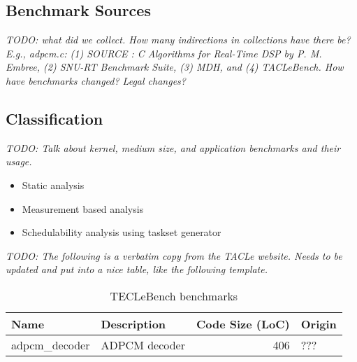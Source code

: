 \documentclass[a4paper,UKenglish]{oasics}
\newcommand{\todo}[1]{{\emph{TODO: #1}}}
\begin{document}
\subsection{Benchmark Sources}

\todo{what did we collect. How many indirections in collections have there be?
E.g., adpcm.c: (1) SOURCE : C Algorithms for Real-Time DSP by P. M. Embree,
(2) SNU-RT Benchmark Suite, (3) MDH, and (4) TACLeBench. How have
benchmarks  changed? Legal changes?}

\subsection{Classification}

\todo{Talk about kernel, medium size, and application benchmarks and their usage.}
\begin{itemize}
\item Static analysis
\item Measurement based analysis
\item Schedulability analysis using taskset generator
\end{itemize}

\todo{The following is a verbatim copy from the TACLe website.
Needs to be updated and put into a nice table, like the following template.}

\begin{table}
  \centering
  \caption{TECLeBench benchmarks}
  \label{tab:bench}
  \begin{tabular}{llrl}
    \toprule
    Name & Description & Code Size (LoC) & Origin \\
    \midrule
    adpcm\_decoder & ADPCM decoder & 406 & ??? \\
    \bottomrule
  \end{tabular}
\end{table}
\end{document}
